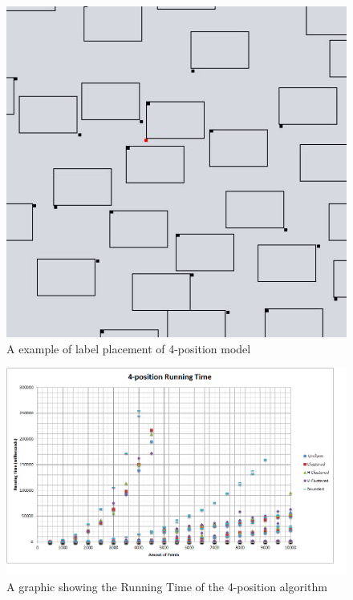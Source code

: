 \documentclass[crop=false,a4paper,oneside,11pt]{standalone}
\begin{document}
\begin{figure}[h!]
 \centering
  \centerline{\includegraphics[scale = 0.5]{4pos_example.JPG}}
  \caption{A example of label placement of 4-position model}
 \end{figure}

 \begin{figure}[h!]
 \centering
 \centerline{\includegraphics[scale = 0.6]{4PosRunningTime.png}}
 \caption{A graphic showing the Running Time of the 4-position algorithm}
 \end{figure}
\end{document}
